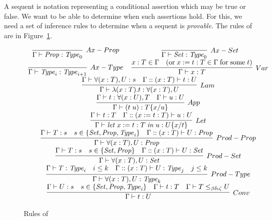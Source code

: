 
A sequent is notation representing a conditional assertion which may be true or false. We want to be able to determine when such assertions hold. For this, we need a set of inference rules to determine when a sequent is \emph{provable}. The rules of \coc{} are in Figure~\ref{fig:cicrules}.

{
\renewcommand{\arraystretch}{3.5}
\newcommand{\cicrlaxprop}{\inferH[Ax-Prop]{\seq[\dyncon{}]{\mathit{Prop} : \mathit{Type}_0}}{}}
\newcommand{\cicrlaxset}{\inferH[Ax-Set]{\seq[\dyncon{}]{\mathit{Set} : \mathit{Type}_0}}{}}
\newcommand{\cicrlaxtype}{\inferH[Ax-Type]{\seq[\dyncon{}]{\mathit{Type}_i : \mathit{Type}_{i + 1}}}{}}
\newcommand{\cicrlvar}{\inferH[Var]{\seq[\dyncon{}]{x : T}}{x : T \in \dyncon{} & (\mathrm{or} \; x := t : T \in \dyncon{} \; \mathrm{for \; some} \; t)}}
\newcommand{\cicrlprodprop}{\inferH[Prod-Prop]{\seq[\dyncon{}]{\forall (x : T), U : \mathit{Prop}}}{\seq[\dyncon{}]{T : s} & s \in \{\mathit{Set} , \mathit{Prop}, \mathit{Type}_i\} & \seq[\dyncon{} :: (x : T)]{U : \mathit{Prop}}}}
\newcommand{\cicrlprodset}{\inferH[Prod-Set]{\seq[\dyncon{}]{\forall (x : T), U : \mathit{Set}}}{\seq[\dyncon{}]{T : s} & s \in \{ \mathit{Set} , \mathit{Prop} \} & \seq[\dyncon{} :: (x : T)]{U : \mathit{Set}}}}
\newcommand{\cicrlprodtype}{\inferH[Prod-Type]{\seq[\dyncon{}]{\forall (x : T), U : \mathit{Type}_k}}{\seq[\dyncon{}]{T : \mathit{Type}_i} & i \leq k & \seq[\dyncon{} :: (x : T)]{U : \mathit{Type}_j} & j \leq k}}
\newcommand{\cicrllam}{\inferH[Lam]{\seq[\dyncon{}]{\lambda (x : T) . t : \forall (x : T), U}}{\seq[\dyncon{}]{\forall (x : T), U : s} & \seq[\dyncon{} :: (x : T)]{t : U}}}
\newcommand{\cicrlapp}{\inferH[App]{\seq[\dyncon{}]{(t \; u) : T \{ x / u \}}}{\seq[\dyncon{}]{t : \forall (x : U), T} & \seq[\dyncon{}]{u : U}}}
\newcommand{\cicrllet}{\inferH[Let]{\seq[\dyncon{}]{\mathit{let} \; x := t : T \; \mathit{in} \; u : U\{x / t\}}}{\seq[\dyncon{}]{t : T} & \seq[\dyncon{} :: (x := t : T)]{u : U}}}
\newcommand{\cicrlconv}{\inferH[Conv]{\seq{t : U}}{\seq{U : s} & s \in \{ \mathit{Set} , \mathit{Prop} , \mathit{Type}_i \} & \seq{t : T} & \seq{T \subtype{} U}}}

\begin{figure}
$$
\begin{tabular}{c c}
\cicrlaxprop{}
&
\cicrlaxset{} \\
%
\cicrlaxtype{}
&
\cicrlvar{} \\
%
\multicolumn{2}{c}{
\cicrllam{}
} \\
\multicolumn{2}{c}{
\cicrlapp{}
} \\
\multicolumn{2}{c}{
\cicrllet{}
} \\
\multicolumn{2}{c}{
\cicrlprodprop{}
} \\
\multicolumn{2}{c}{
\cicrlprodset{}
} \\
\multicolumn{2}{c}{
\cicrlprodtype{}
} \\
\multicolumn{2}{c}{
\cicrlconv{}
}
\end{tabular}
$$
\caption{Rules of \coc{} \label{fig:cicrules}}
\end{figure}
}

